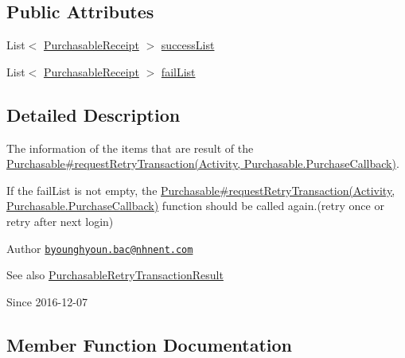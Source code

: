 \subsection*{Public Attributes}
\begin{DoxyCompactItemize}
\item 
List$<$ \hyperlink{classcom_1_1toast_1_1android_1_1gamebase_1_1base_1_1purchase_1_1_purchasable_receipt}{Purchasable\+Receipt} $>$ \hyperlink{classcom_1_1toast_1_1android_1_1gamebase_1_1base_1_1purchase_1_1_purchasable_retry_transaction_result_a94d9eecba2a24c99fd6c0a120803c18c}{success\+List}
\item 
List$<$ \hyperlink{classcom_1_1toast_1_1android_1_1gamebase_1_1base_1_1purchase_1_1_purchasable_receipt}{Purchasable\+Receipt} $>$ \hyperlink{classcom_1_1toast_1_1android_1_1gamebase_1_1base_1_1purchase_1_1_purchasable_retry_transaction_result_a4a6a726bab7d926265f330f4e67055b9}{fail\+List}
\end{DoxyCompactItemize}


\subsection{Detailed Description}
The information of the items that are result of the \hyperlink{}{Purchasable\#request\+Retry\+Transaction(\+Activity, Purchasable.\+Purchase\+Callback)}. 

If the fail\+List is not empty, the \hyperlink{}{Purchasable\#request\+Retry\+Transaction(\+Activity, Purchasable.\+Purchase\+Callback)} function should be called again.(retry once or retry after next login)

\begin{DoxyAuthor}{Author}
\href{mailto:byounghyoun.bac@nhnent.com}{\tt byounghyoun.\+bac@nhnent.\+com} 
\end{DoxyAuthor}
\begin{DoxySeeAlso}{See also}
\hyperlink{classcom_1_1toast_1_1android_1_1gamebase_1_1base_1_1purchase_1_1_purchasable_retry_transaction_result}{Purchasable\+Retry\+Transaction\+Result} 
\end{DoxySeeAlso}
\begin{DoxySince}{Since}
2016-\/12-\/07 
\end{DoxySince}


\subsection{Member Function Documentation}
\mbox{\label{classcom_1_1toast_1_1android_1_1gamebase_1_1base_1_1_value_object_ae6655c88c20a9a8406dc11b46250ac7b}} 

